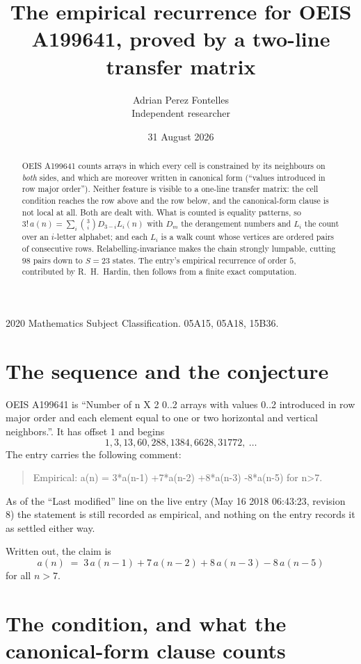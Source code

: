 \documentclass[11pt,a4paper]{article}
\title{The empirical recurrence for OEIS A199641, proved by a two-line transfer matrix}
\author{Adrian Perez Fontelles\\ \small Independent researcher}
\date{31 August 2026}
\theoremstyle{plain}
\theoremstyle{definition}
\begin{document}
\maketitle

\begin{abstract}
OEIS A199641 counts arrays in which every cell is constrained by its neighbours on \emph{both}
sides, and which are moreover written in canonical form (``values introduced in row major
order''). Neither feature is visible to a one-line transfer matrix: the cell condition
reaches the row above and the row below, and the canonical-form clause is not local at
all. Both are dealt with. What is counted is equality patterns, so
$3!\,a(n)=\sum_i\binom{3}{i}D_{3-i}L_i(n)$ with $D_m$ the derangement numbers and
$L_i$ the count over an $i$-letter alphabet; and each $L_i$ is a walk count whose vertices
are ordered pairs of consecutive rows. Relabelling-invariance makes the chain strongly
lumpable, cutting $98$ pairs down to $S=23$ states. The entry's empirical recurrence of
order $5$, contributed by R.~H.~Hardin, then follows from a finite exact computation.
\end{abstract}

\noindent\small 2020 Mathematics Subject Classification. 05A15, 05A18, 15B36.\normalsize

\section{The sequence and the conjecture}

OEIS A199641 is ``Number of n X 2 0..2 arrays with values 0..2 introduced in row major order and each element equal to one or two horizontal and vertical neighbors.''. It has offset $1$ and begins
\[
1, 3, 13, 60, 288, 1384, 6628, 31772,\ \dots
\]
The entry carries the following comment:
\begin{quote}\small
Empirical: a(n) = 3*a(n-1) +7*a(n-2) +8*a(n-3) -8*a(n-5) for n>7.
\end{quote}
As of the ``Last modified'' line on the live entry (May 16 2018 06:43:23, revision 8) the statement is
still recorded as empirical, and nothing on the entry records it as settled either way.

Written out, the claim is
\begin{equation}\label{eq:conj}
a(n)\;=\;3\,a(n-1) + 7\,a(n-2) + 8\,a(n-3) - 8\,a(n-5)
\end{equation}
for all $n>7$.

\section{The condition, and what the canonical-form clause counts}
\end{document}
